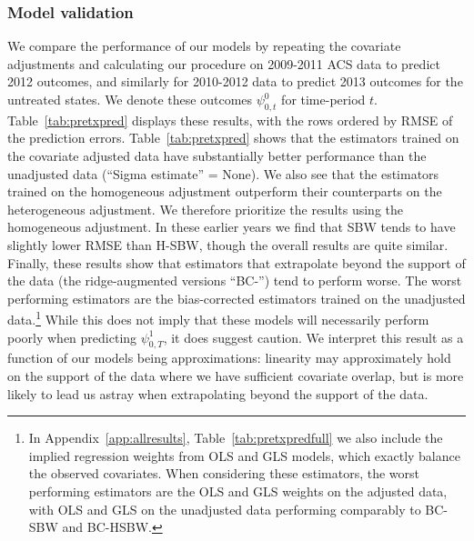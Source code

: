 \documentclass[aoas]{imsart}
\theoremstyle{plain}
\theoremstyle{remark}
\begin{document}
\subsubsection{Model validation}

We compare the performance of our models by repeating the covariate adjustments and calculating our procedure on 2009-2011 ACS data to predict 2012 outcomes, and similarly for 2010-2012 data to predict 2013 outcomes for the untreated states. We denote these outcomes $\psi^0_{0, t}$ for time-period $t$. Table~\ref{tab:pretxpred} displays these results, with the rows ordered by RMSE of the prediction errors. Table~\ref{tab:pretxpred} shows that the estimators trained on the covariate adjusted data have substantially better performance than the unadjusted data (``Sigma estimate'' = None). We also see that the estimators trained on the homogeneous adjustment outperform their counterparts on the heterogeneous adjustment. We therefore prioritize the results using the homogeneous adjustment. In these earlier years we find that SBW tends to have slightly lower RMSE than H-SBW, though the overall results are quite similar. Finally, these results show that estimators that extrapolate beyond the support of the data (the ridge-augmented versions ``BC-'') tend to perform worse. The worst performing estimators are the bias-corrected estimators trained on the unadjusted data.\footnote{In Appendix~\ref{app:allresults}, Table~\ref{tab:pretxpredfull} we also include the implied regression weights from OLS and GLS models, which exactly balance the observed covariates. When considering these estimators, the worst performing estimators are the OLS and GLS weights on the adjusted data, with OLS and GLS on the unadjusted data performing comparably to BC-SBW and BC-HSBW.} While this does not imply that these models will necessarily perform poorly when predicting $\psi^1_{0, T}$, it does suggest caution. We interpret this result as a function of our models being approximations: linearity may approximately hold on the support of the data where we have sufficient covariate overlap, but is more likely to lead us astray when extrapolating beyond the support of the data.
\end{document}
